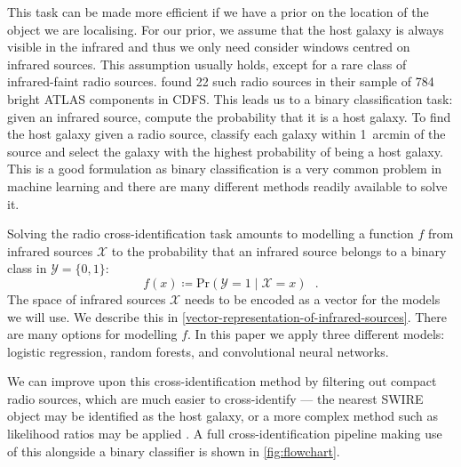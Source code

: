\documentclass[fleqn,usenatbib,usedcolumn]{mnras}
\begin{document}
    This task can be made more efficient if we have a prior on the location of
    the object we are localising. For our prior, we assume that the host galaxy
    is always visible in the infrared and thus we only need consider windows
    centred on infrared sources. This assumption usually holds, except for a
    rare class of infrared-faint radio sources. \citet{norris06} found 22 such
    radio sources in their sample of 784 bright ATLAS components in CDFS. This
    leads us to a binary classification task: given an infrared source, compute
    the probability that it is a host galaxy. To find the host galaxy given a
    radio source, classify each galaxy within 1~arcmin of the source and select
    the galaxy with the highest probability of being a host galaxy. This is a
    good formulation as binary classification is a very common problem in
    machine learning and there are many different methods readily available to
    solve it.

    Solving the radio cross-identification task amounts to modelling a function
    $f$ from infrared sources $\mathcal{X}$ to the probability that an infrared
    source belongs to a binary class in $\mathcal{Y} = \{0, 1\}$:
    \begin{equation}
        f(x) \coloneqq \text{Pr}\left(\mathcal{Y} = 1 \mid \mathcal X = x\right)\,\,\,\,.
    \end{equation}
    The space of infrared sources $\mathcal{X}$ needs to be encoded as a vector
    for the models we will use. We describe this in
    \autoref{vector-representation-of-infrared-sources}. There are many options
    for modelling $f$. In this paper we apply three different models: logistic
    regression, random forests, and convolutional neural networks.

    We can improve upon this cross-identification method by filtering out
    compact radio sources, which are much easier to cross-identify --- the
    nearest SWIRE object may be identified as the host galaxy, or a more
    complex method such as likelihood ratios may be applied
    \citep[see][]{weston17}. A full cross-identification pipeline making use
    of this alongside a binary classifier is shown in \autoref{fig:flowchart}.
\end{document}
